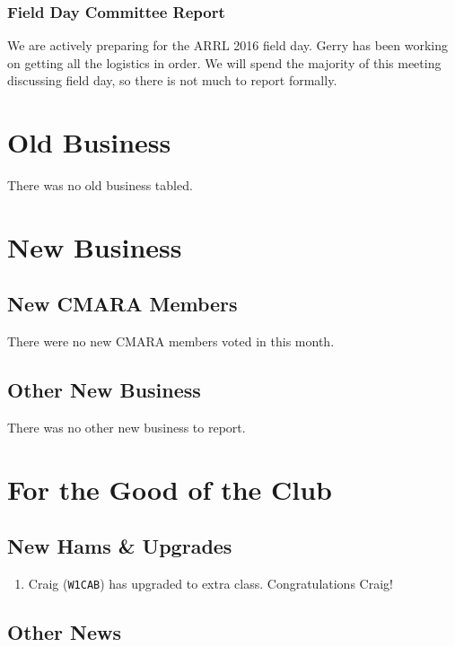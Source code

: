 \documentclass[10pt,letterpaper]{article}
\begin{document}
\subsubsection{Field Day Committee Report}

We are actively preparing for the ARRL 2016 field day. Gerry has been working on getting all the logistics in order. We will spend the majority of this meeting discussing field day, so there is not much to report formally.

\section{Old Business}

There was no old business tabled.

\section{New Business}

\subsection{New CMARA Members}

There were no new CMARA members voted in this month.

\subsection{Other New Business}

There was no other new business to report.

\section{For the Good of the Club}

\subsection{New Hams \& Upgrades}

\begin{enumerate}
\item Craig (\texttt{W1CAB}) has upgraded to extra class. Congratulations Craig!
\end{enumerate}

\subsection{Other News}
\end{document}
